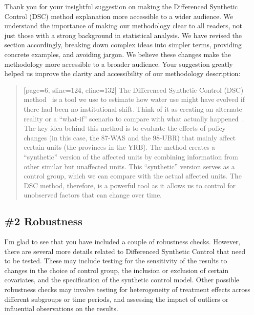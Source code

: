 \AR{} Thank you for your insightful suggestion on making the Differenced Synthetic Control (DSC) method explanation more accessible to a wider audience. We understand the importance of making our methodology clear to all readers, not just those with a strong background in statistical analysis. We have revised the section accordingly, breaking down complex ideas into simpler terms, providing concrete examples, and avoiding jargon. We believe these changes make the methodology more accessible to a broader audience. Your suggestion greatly helped us improve the clarity and accessibility of our methodology description:

\begin{quote}[page=6, sline=124, eline=132]
    The Differenced Synthetic Control (DSC) method~\cite{arkhangelsky2021} is a tool we use to estimate how water use might have evolved if there had been no institutional shift.
    Think of it as creating an alternate reality or a ``what-if'' scenario to compare with what actually happened~\cite{abadie2010, abadie2015, hill2021}.
    The key idea behind this method is to evaluate the effects of policy changes (in this case, the 87-WAS and the 98-UBR) that mainly affect certain units (the provinces in the YRB).
    The method creates a ``synthetic'' version of the affected units by combining information from other similar but unaffected units. This ``synthetic'' version serves as a control group, which we can compare with the actual affected units.
    The DSC method, therefore, is a powerful tool as it allows us to control for unobserved factors that can change over time.
\end{quote}

\subsection{\#2 Robustness}\label{sec:2-2}

\RC{} I'm glad to see that you have included a couple of robustness checks. However, there are several more details related to Differenced Synthetic Control that need to be tested. These may include testing for the sensitivity of the results to changes in the choice of control group, the inclusion or exclusion of certain covariates, and the specification of the synthetic control model. Other possible robustness checks may involve testing for heterogeneity of treatment effects across different subgroups or time periods, and assessing the impact of outliers or influential observations on the results.

